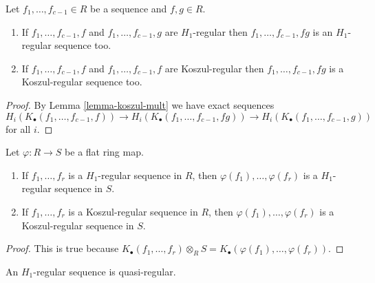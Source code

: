 \begin{lemma}
\label{lemma-mult-koszul-regular}
Let $f_1, \ldots, f_{c - 1} \in R$ be a sequence and $f, g \in R$.
\begin{enumerate}
\item If $f_1, \ldots, f_{c - 1}, f$ and $f_1, \ldots, f_{c - 1}, g$
are $H_1$-regular then $f_1, \ldots, f_{c - 1}, fg$ is an
$H_1$-regular sequence too.
\item If $f_1, \ldots, f_{c - 1}, f$ and $f_1, \ldots, f_{c - 1}, f$ are
Koszul-regular then $f_1, \ldots, f_{c - 1}, fg$ is a Koszul-regular
sequence too.
\end{enumerate}
\end{lemma}

\begin{proof}
By
Lemma \ref{lemma-koszul-mult}
we have exact sequences
$$
H_i(K_\bullet(f_1, \ldots, f_{c - 1}, f)) \to
H_i(K_\bullet(f_1, \ldots, f_{c - 1}, fg)) \to
H_i(K_\bullet(f_1, \ldots, f_{c - 1}, g))
$$
for all $i$.
\end{proof}

\begin{lemma}
\label{lemma-koszul-regular-flat-base-change}
Let $\varphi : R \to S$ be a flat ring map.
\begin{enumerate}
\item If $f_1, \ldots, f_r$ is a $H_1$-regular sequence in $R$, then
$\varphi(f_1), \ldots, \varphi(f_r)$ is a $H_1$-regular sequence in $S$.
\item If $f_1, \ldots, f_r$ is a Koszul-regular sequence in $R$, then
$\varphi(f_1), \ldots, \varphi(f_r)$ is a Koszul-regular sequence in $S$.
\end{enumerate}
\end{lemma}

\begin{proof}
This is true because
$K_\bullet(f_1, \ldots, f_r) \otimes_R S =
K_\bullet(\varphi(f_1), \ldots, \varphi(f_r))$.
\end{proof}

\begin{lemma}
\label{lemma-H1-regular-quasi-regular}
An $H_1$-regular sequence is quasi-regular.
\end{lemma}

